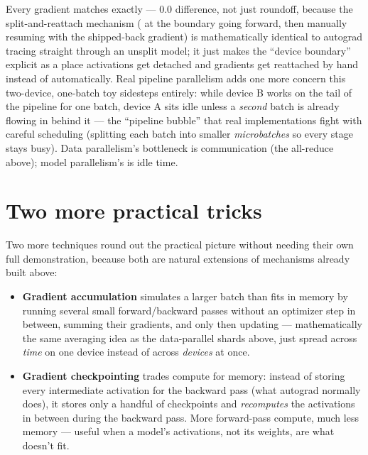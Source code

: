 Every gradient matches exactly --- $0.0$ difference, not just roundoff, because the split-and-reattach mechanism ( at the boundary going forward, then manually resuming  with the shipped-back gradient) is mathematically identical to autograd tracing straight through an unsplit model; it just makes the ``device boundary'' explicit as a place activations get detached and gradients get reattached by hand instead of automatically. Real pipeline parallelism adds one more concern this two-device, one-batch toy sidesteps entirely: while device B works on the tail of the pipeline for one batch, device A sits idle unless a \emph{second} batch is already flowing in behind it --- the ``pipeline bubble'' that real implementations fight with careful scheduling (splitting each batch into smaller \emph{microbatches} so every stage stays busy). Data parallelism's bottleneck is communication (the all-reduce above); model parallelism's is idle time.

\section{Two more practical tricks}

Two more techniques round out the practical picture without needing their own full demonstration, because both are natural extensions of mechanisms already built above:
\begin{itemize}
  \item \textbf{Gradient accumulation} simulates a larger batch than fits in memory by running several small forward/backward passes without an optimizer step in between, summing their gradients, and only then updating --- mathematically the same averaging idea as the data-parallel shards above, just spread across \emph{time} on one device instead of across \emph{devices} at once.
  \item \textbf{Gradient checkpointing} trades compute for memory: instead of storing every intermediate activation for the backward pass (what autograd normally does), it stores only a handful of checkpoints and \emph{recomputes} the activations in between during the backward pass. More forward-pass compute, much less memory --- useful when a model's activations, not its weights, are what doesn't fit.
\end{itemize}

